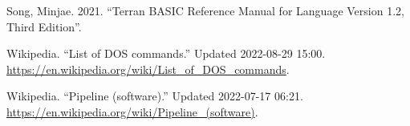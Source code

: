 \begin{itemlist}
\item Song, Minjae. 2021. ``Terran BASIC Reference Manual for Language Version 1.2, Third Edition''.
\item Wikipedia. ``List of DOS commands.'' Updated 2022-08-29 15:00. \url{https://en.wikipedia.org/wiki/List_of_DOS_commands}.
\item Wikipedia. ``Pipeline (software).'' Updated 2022-07-17 06:21. \url{https://en.wikipedia.org/wiki/Pipeline_(software)}.
\end{itemlist}
